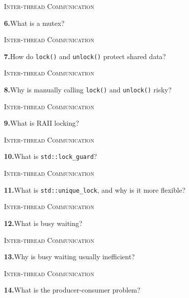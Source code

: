 \documentclass[11pt,a4paper]{article}
\newenvironment{questionblock}{%
  \begin{minipage}[t][0.455\textheight][t]{\textwidth}%
  \raggedright\small
}{%
  \vfill
  \end{minipage}%
}
\newcommand{\sectionlabel}[1]{\textsc{#1}\par\vspace{0.35em}}
\newcommand{\questionnumber}[1]{\textbf{#1.}\enspace}
\begin{document}
\vspace*{0.04\textheight}
\begin{questionblock}
\sectionlabel{Inter-thread Communication}
\questionnumber{6}What is a mutex?\par
\end{questionblock}
\newpage
\begin{questionblock}
\sectionlabel{Inter-thread Communication}
\questionnumber{7}How do \verb|lock()| and \verb|unlock()| protect shared data?\par
\end{questionblock}
\vspace*{0.04\textheight}
\begin{questionblock}
\sectionlabel{Inter-thread Communication}
\questionnumber{8}Why is manually calling \verb|lock()| and \verb|unlock()| risky?\par
\end{questionblock}
\newpage
\begin{questionblock}
\sectionlabel{Inter-thread Communication}
\questionnumber{9}What is RAII locking?\par
\end{questionblock}
\vspace*{0.04\textheight}
\begin{questionblock}
\sectionlabel{Inter-thread Communication}
\questionnumber{10}What is \verb|std::lock_guard|?\par
\end{questionblock}
\newpage
\begin{questionblock}
\sectionlabel{Inter-thread Communication}
\questionnumber{11}What is \verb|std::unique_lock|, and why is it more flexible?\par
\end{questionblock}
\vspace*{0.04\textheight}
\begin{questionblock}
\sectionlabel{Inter-thread Communication}
\questionnumber{12}What is busy waiting?\par
\end{questionblock}
\newpage
\begin{questionblock}
\sectionlabel{Inter-thread Communication}
\questionnumber{13}Why is busy waiting usually inefficient?\par
\end{questionblock}
\vspace*{0.04\textheight}
\begin{questionblock}
\sectionlabel{Inter-thread Communication}
\questionnumber{14}What is the producer-consumer problem?\par
\end{questionblock}
\end{document}

